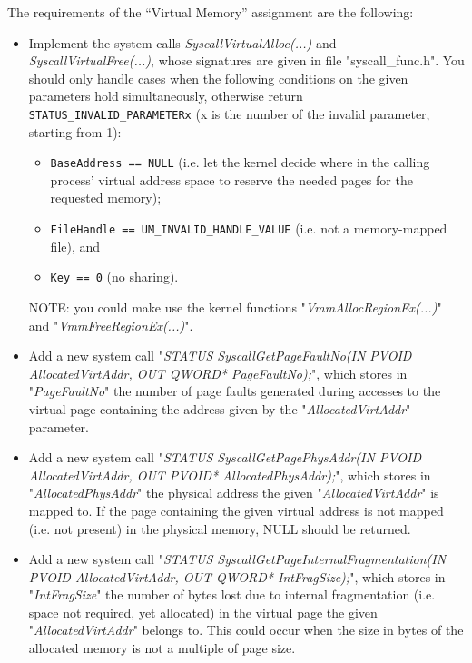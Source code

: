 The requirements of the ``Virtual Memory'' assignment are the following:
\begin{itemize}
    \item Implement the system calls \textit{SyscallVirtualAlloc(...)} and \textit{SyscallVirtualFree(...)}, whose signatures are given in file "syscall\_func.h". You should only handle cases when the following conditions on the given parameters hold simultaneously, otherwise return \texttt{STATUS\_INVALID\_PARAMETERx} (x is the number of the invalid parameter, starting from 1):
        \begin{itemize}
            \item  \texttt{BaseAddress == NULL} (i.e. let the kernel decide where in the calling process' virtual address space to reserve the needed pages for the requested memory);

            \item \texttt{FileHandle == UM\_INVALID\_HANDLE\_VALUE} (i.e. not a memory-mapped file), and

            \item \texttt{Key == 0} (no sharing).
        \end{itemize}
        NOTE: you could make use the kernel functions "\textit{VmmAllocRegionEx(...)}" and "\textit{VmmFreeRegionEx(...)}". 


        \item Add a new system call "\textit{STATUS SyscallGetPageFaultNo(IN PVOID AllocatedVirtAddr, OUT QWORD* PageFaultNo);}", which stores in "\textit{PageFaultNo}" the number of page faults generated during accesses to the virtual page containing the address given by the "\textit{AllocatedVirtAddr}" parameter. 

        \item Add a new system call "\textit{STATUS SyscallGetPagePhysAddr(IN PVOID AllocatedVirtAddr, OUT PVOID* AllocatedPhysAddr);}", which stores in "\textit{AllocatedPhysAddr}" the physical address the given "\textit{AllocatedVirtAddr}" is mapped to. If the page containing the given virtual address is not mapped (i.e. not present) in the physical memory, NULL should be returned.

        \item Add a new system call "\textit{STATUS SyscallGetPageInternalFragmentation(IN PVOID AllocatedVirtAddr, OUT QWORD* IntFragSize);}", which stores in "\textit{IntFragSize}" the number of bytes lost due to internal fragmentation (i.e. space not required, yet allocated) in the virtual page the given "\textit{AllocatedVirtAddr}" belongs to. This could occur when the size in bytes of the allocated memory is not a multiple of page size.


\end{itemize}
